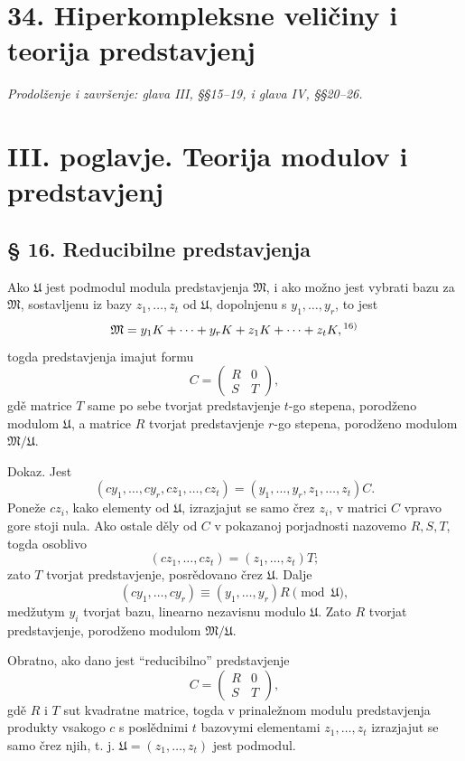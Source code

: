 \documentclass[11pt]{article}
\providecommand{\mM}{\mathfrak{M}}
\providecommand{\mU}{\mathfrak{U}}
\begin{document}
\section*{34. Hiperkompleksne veličiny i teorija predstavjenj}
\emph{Prodolženje i završenje: glava III, §§15--19, i glava IV, §§20--26.}

\section*{III. poglavje. Teorija modulov i predstavjenj}

\subsection*{§ 16. Reducibilne predstavjenja}

Ako $\mU$ jest podmodul modula predstavjenja $\mM$, i ako možno jest vybrati bazu za $\mM$, sostavljenu iz bazy $z_1,\ldots,z_t$ od $\mU$, dopolnjenu s $y_1,\ldots,y_r$, to jest
\[
        \mM=y_1K+\cdots+y_rK+z_1K+\cdots+z_tK,\textsuperscript{16)}
\]
togda predstavjenja imajut formu
\[
        C=\begin{pmatrix}R&0\\ S&T\end{pmatrix},
\]
gdě matrice $T$ same po sebe tvorjat predstavjenje $t$-go stepena, porodženo modulom $\mU$, a matrice $R$ tvorjat predstavjenje $r$-go stepena, porodženo modulom $\mM/\mU$.

Dokaz. Jest
\[
        (cy_1,\ldots,cy_r,cz_1,\ldots,cz_t)
        =(y_1,\ldots,y_r,z_1,\ldots,z_t)C.
\]
Poneže $cz_i$, kako elementy od $\mU$, izrazjajut se samo črez $z_i$, v matrici $C$ vpravo gore stoji nula. Ako ostale děly od $C$ v pokazanoj porjadnosti nazovemo $R,S,T$, togda osoblivo
\[
        (cz_1,\ldots,cz_t)=(z_1,\ldots,z_t)T;
\]
zato $T$ tvorjat predstavjenje, posrědovano črez $\mU$. Dalje
\[
        (cy_1,\ldots,cy_r)\equiv (y_1,\ldots,y_r)R\pmod{\mU},
\]
medžutym $y_i$ tvorjat bazu, linearno nezavisnu modulo $\mU$. Zato $R$ tvorjat predstavjenje, porodženo modulom $\mM/\mU$.

Obratno, ako dano jest ``reducibilno'' predstavjenje
\[
        C=\begin{pmatrix}R&0\\ S&T\end{pmatrix},
\]
gdě $R$ i $T$ sut kvadratne matrice, togda v prinaležnom modulu predstavjenja produkty vsakogo $c$ s poslědnimi $t$ bazovymi elementami $z_1,\ldots,z_t$ izrazjajut se samo črez njih, t. j. $\mU=(z_1,\ldots,z_t)$ jest podmodul.
\end{document}
